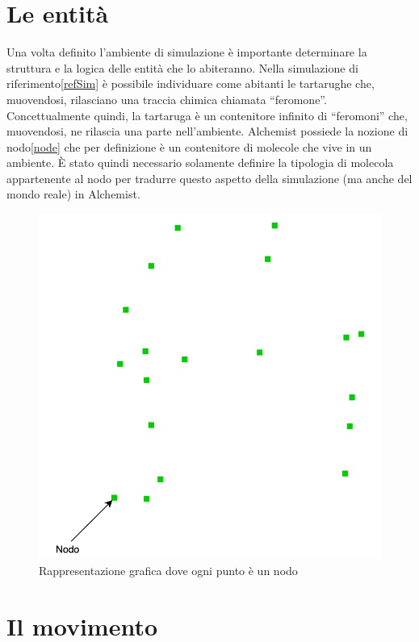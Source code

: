 \documentclass[12pt,a4paper,openright,twoside]{book}
\begin{document}
\section{Le entità}
Una volta definito l'ambiente di simulazione è importante determinare la struttura e la logica delle 
entità che lo abiteranno. Nella simulazione di riferimento\space\ref{refSim} è possibile individuare come abitanti le tartarughe
che, muovendosi, rilasciano una traccia chimica chiamata ``feromone''. Concettualmente quindi, la tartaruga è un contenitore infinito di 
``feromoni'' che, muovendosi, ne rilascia una parte nell'ambiente. Alchemist possiede la nozione di nodo\space\ref{node} che per definizione
è un contenitore di molecole che vive in un ambiente. È stato quindi necessario solamente definire la tipologia di molecola
appartenente al nodo per tradurre questo aspetto della simulazione (ma anche del mondo reale) in Alchemist.
\begin{figure}[h!]
    \centering
    \includegraphics[width=.7\linewidth]{figures/nodes.png}
    \caption{Rappresentazione grafica dove ogni punto è un nodo}\label{fig:nodes}
\end{figure}
\clearpage
\section{Il movimento}
\end{document}
